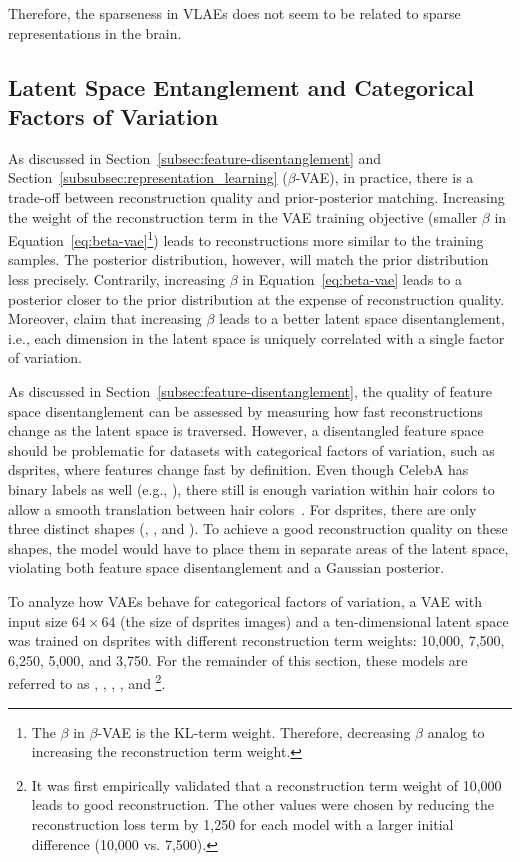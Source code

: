Therefore, the sparseness in \acp{VLAE} does not seem to be related to sparse representations in the brain.

\subsection{Latent Space Entanglement and Categorical Factors of Variation}\label{subsec:latent-space-entanglement-and-categorical-factors-of-variation}

As discussed in Section~\ref{subsec:feature-disentanglement} and Section~\ref{subsubsec:representation_learning} ($\beta$-\ac{VAE}), in practice, there is a trade-off between reconstruction quality and prior-posterior matching.
Increasing the weight of the reconstruction term in the \ac{VAE} training objective (smaller $\beta$ in Equation~\ref{eq:beta-vae}\footnote{The $\beta$ in $\beta$-\ac{VAE} is the \ac{KL}-term weight. Therefore, decreasing $\beta$ analog to increasing the reconstruction term weight.}) leads to reconstructions more similar to the training samples.
The posterior distribution, however, will match the prior distribution less precisely.
Contrarily, increasing $\beta$ in Equation~\ref{eq:beta-vae} leads to a posterior closer to the prior distribution at the expense of reconstruction quality.
Moreover, \citet{higgins2017beta} claim that increasing $\beta$ leads to a better latent space disentanglement, i.e., each dimension in the latent space is uniquely correlated with a single factor of variation.

As discussed in Section~\ref{subsec:feature-disentanglement}, the quality of feature space disentanglement can be assessed by measuring how fast reconstructions change as the latent space is traversed.
However, a disentangled feature space should be problematic for datasets with categorical factors of variation, such as dsprites, where features change fast by definition.
Even though CelebA has binary labels as well (e.g., ), there still is enough variation within hair colors to allow a smooth translation between hair colors~\citep{higgins2017beta}.
For dsprites, there are only three distinct shapes (, , and ).
To achieve a good reconstruction quality on these shapes, the model would have to place them in separate areas of the latent space, violating both feature space disentanglement and a Gaussian posterior.

To analyze how \acp{VAE} behave for categorical factors of variation, a \ac{VAE} with input size $64\times 64$ (the size of dsprites images) and a ten-dimensional latent space was trained on dsprites with different reconstruction term weights: 10,000, 7,500, 6,250, 5,000, and 3,750.
For the remainder of this section, these models are referred to as , , , , and \footnote{It was first empirically validated that a reconstruction term weight of 10,000 leads to good reconstruction. The other values were chosen by reducing the reconstruction loss term by 1,250 for each model with a larger initial difference (10,000 vs. 7,500).}.

